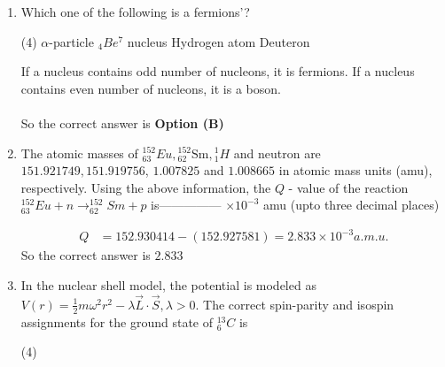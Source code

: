 \begin{enumerate}
\begin{tasks}
\task[\textbf{C.}] Not allowed by Fermi but allowed by Gamow-Teller selection rule
\task[\textbf{D.}] Not allowed both by Fermi and Gamow-Teller selection rule
\end{tasks}
\begin{answer}
\begin{align*}
\intertext{According to Fermi Selection Rule:}
\Delta I&=0, \quad\text{ Parity }=\text{ No Change}
\intertext{According to Gammow-Teller Selection Rule:}
\Delta I&=0, \pm 1, \quad \text{ Parity $=$ No Change}
\intertext{In the $\beta$ decay process, the transition $2^{+} \rightarrow 3^{+}$,}
\Delta I&=\pm 1, \quad\text{ Parity $=$ No Change}
\end{align*}
So the correct answer is \textbf{Option (C)}
\end{answer}
\item Which one of the following is a fermions'?
{}
\begin{tasks}(4)
\task[\textbf{A.}] $\alpha$-particle
\task[\textbf{B.}] ${ }_{4} B e^{7}$ nucleus
\task[\textbf{C.}] Hydrogen atom
\task[\textbf{D.}] Deuteron
\end{tasks}
\begin{answer}
If a nucleus contains odd number of nucleons, it is fermions. If a nucleus contains even number of nucleons, it is a boson.\\\\
So the correct answer is \textbf{Option (B)}
\end{answer}
\item The atomic masses of ${ }_{63}^{152} E u,{ }_{62}^{152} \mathrm{Sm},{ }_{1}^{1} H$ and neutron are $151.921749,151.919756$, $1.007825$ and $1.008665$ in atomic mass units (amu), respectively. Using the above information, the $Q$ - value of the reaction ${ }_{63}^{152} E u+n \rightarrow_{62}^{152} S m+p$ is--------------- $\times 10^{-3}$ amu (upto three decimal places)
{}
\begin{answer}
\begin{align*}
Q&=152.930414-(152.927581)=2.833 \times 10^{-3} a.m.u.
\end{align*}
So the correct answer is $2.833$
\end{answer}
\item In the nuclear shell model, the potential is modeled as $V(r)=\frac{1}{2} m \omega^{2} r^{2}-\lambda \vec{L} \cdot \vec{S}, \lambda>0$. The correct spin-parity and isospin assignments for the ground state of ${ }_{6}^{13} C$ is
{}
\begin{tasks}(4)

\end{tasks}
\end{enumerate}
